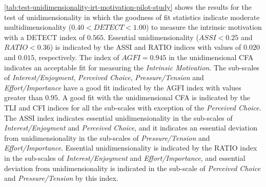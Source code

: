\autoref{tab:test-unidimensionality-irt-motivation-pilot-study} shows the results for the test of unidimensionality in which the goodness of fit statistics indicate moderate multidimensionality ($0.40 < DETECT < 1.00$) to measure the intrinsic motivation with a DETECT index of $0.565$. Essential unidimensionality ($ASSI < 0.25$ and $RATIO < 0.36$) is indicated by the ASSI and RATIO indices with values of $0.020$ and $0.015$, respectively. The index of $AGFI = 0.945$ in the unidimensional CFA indicates an acceptable fit for measuring the \emph{Intrinsic Motivation}. The sub-scales of \emph{Interest/Enjoyment}, \emph{Perceived Choice}, \emph{Pressure/Tension} and \emph{Effort/Importance} have a good fit indicated by the AGFI index with values greater than $0.95$. A good fit with the unidimensional CFA is indicated by the TLI and CFI indices for all the sub-scales with exception of the \emph{Perceived Choice}. The ASSI index indicates essential unidimensionality in the sub-scales of \emph{Interest/Enjoyment} and \emph{Perceived Choice}, and it indicates an essential deviation from unidimensionality in the sub-scales of \emph{Pressure/Tension} and \emph{Effort/Importance}. Essential unidimensionality is indicated by the RATIO index in the sub-scales of \emph{Interest/Enjoyment} and \emph{Effort/Importance}, and essential deviation from unidimensionality is indicated in the sub-scale of \emph{Perceived Choice} and \emph{Pressure/Tension} by this index.


